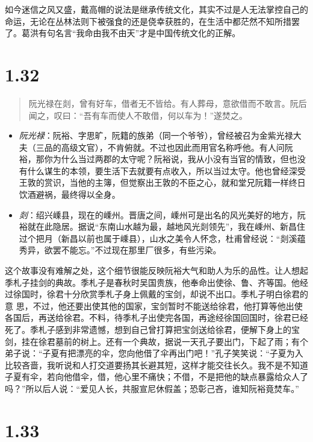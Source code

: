 \documentclass[]{book}
\providecommand{\tightlist}{%
  \setlength{\itemsep}{0pt}\setlength{\parskip}{0pt}}
\begin{document}
如今迷信之风又盛，戴高帽的说法是继承传统文化，其实不过是人无法掌控自己的命运，无论在丛林法则下被强食的还是侥幸获胜的，在生活中都茫然不知所措罢了。葛洪有句名言``我命由我不由天''才是中国传统文化的正解。

\section{1.32}\label{section-31}

\begin{quote}
阮光禄在剡，曾有好车，借者无不皆给。有人葬母，意欲借而不敢言。阮后闻之，叹曰：``吾有车而使人不敢借，何以车为！''遂焚之。
\end{quote}

\begin{itemize}
\tightlist
\item
  \emph{阮光禄}：阮裕、字思旷，阮籍的族弟（同一个爷爷），曾经被召为金紫光禄大夫（三品的高级文官），不肯俯就。不过也因此而用官名称呼他。有人问阮裕，那你为什么当过两郡的太守呢？阮裕说，我从小没有当官的情致，但也没有什么谋生的本领，要生活下去就要有点收入，所以当过太守。他也曾经深受王敦的赏识，当他的主簿，但觉察出王敦的不臣之心，就和堂兄阮籍一样终日饮酒避祸，最终得以全身。
\item
  \emph{剡}：绍兴嵊县，现在的嵊州。晋唐之间，嵊州可是出名的风光美好的地方，阮裕就在此隐居。据说``东南山水越为最，越地风光剡领先''，我在嵊州、新昌住过个把月（新昌以前也属于嵊县），山水之美令人怀念，杜甫曾经说：``剡溪蕴秀异，欲罢不能忘。''不过现在那里厂很多，有些污染。
\end{itemize}

这个故事没有难解之处，这个细节很能反映阮裕大气和助人为乐的品性。让人想起季札子挂剑的典故。季札子是春秋时吴国贵族，他奉命出使徐、鲁、齐等国。他经过徐国时，徐君十分欣赏季札子身上佩戴的宝剑，却说不出口。季札子明白徐君的意
思，不过，他还要出使其他的国家，宝剑暂时不能送给徐君，他打算等他出使各国后，再送给徐君。不料，待季札子出使完各国，再途经徐国回国时，徐君已经死了。季札子感到非常遗憾，想到自己曾打算把宝剑送给徐君，便解下身上的宝剑，挂在徐君墓前的树上。还有一个典故，据说一天孔子要出门，下起了雨；有个弟子说：``子夏有把漂亮的伞，您向他借了伞再出门吧！''孔子笑笑说：``子夏为入比较吝啬，我听说和人打交道要扬其长避其短，这样才能交往长久。我不是不知道子夏有伞，若向他借伞，借，他心里不痛快；不借，不是把他的缺点暴露给众人了吗？''所以后人说：``爱见人长，共服宣尼休假盖；恐彰己吝，谁知阮裕竟焚车。''

\section{1.33}\label{section-32}
\end{document}
